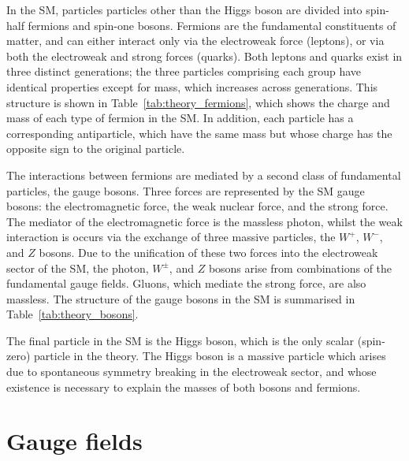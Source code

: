 In the SM, particles particles other than the Higgs boson are divided into spin-half fermions
and spin-one bosons.
Fermions are the fundamental constituents of matter, 
and can either interact only via the electroweak force (leptons), 
or via both the electroweak and strong forces (quarks).
Both leptons and quarks exist in three distinct generations;
the three particles comprising each group have identical properties 
except for mass, which increases across generations.
This structure is shown in Table~\ref{tab:theory_fermions}, 
which shows the charge and mass of each type of fermion in the SM.
In addition, each particle has a corresponding antiparticle, 
which have the same mass but whose charge has the opposite sign to the original particle.


The interactions between fermions are mediated by a second class of fundamental particles, 
the gauge bosons.
Three forces are represented by the SM gauge bosons: 
the electromagnetic force, the weak nuclear force, and the strong force.
The mediator of the electromagnetic force is the massless photon, 
whilst the weak interaction is occurs via the exchange of three massive particles, 
the $W^+$, $W^-$, and $Z$ bosons.
Due to the unification of these two forces into the electroweak sector of the SM, 
the photon, $W^\pm$, and $Z$ bosons arise from combinations of the fundamental gauge fields.
Gluons, which mediate the strong force, 
are also massless.
The structure of the gauge bosons in the SM is summarised in Table~\ref{tab:theory_bosons}.


The final particle in the SM is the Higgs boson, 
which is the only scalar (spin-zero) particle in the theory.
The Higgs boson is a massive particle which arises 
due to spontaneous symmetry breaking in the electroweak sector, 
and whose existence is necessary to explain the masses of both bosons and fermions.

\section{Gauge fields}

